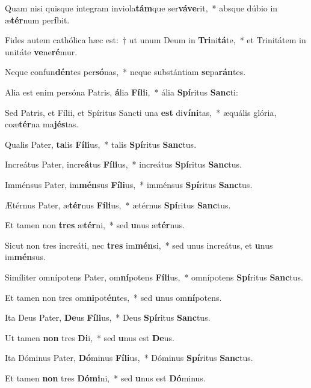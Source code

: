 \item Quam nisi quisque íntegram inviola\textbf{tám}que ser\textbf{vá}\textbf{ve}rit,~* absque dúbio in æ\textbf{tér}num per\textbf{í}bit.
\item Fides autem cathólica hæc est:~† ut unum Deum in \textbf{Tri}ni\textbf{tá}te,~* et Trinitátem in unitáte \textbf{ve}ne\textbf{ré}mur.
\item Neque confun\textbf{dén}tes per\textbf{só}nas,~* neque substántiam \textbf{se}pa\textbf{rán}tes.
\item Alia est enim persóna Patris, \textbf{á}lia \textbf{Fí}\textbf{li}i,~* ália \textbf{Spí}ritus \textbf{Sanc}ti:
\item Sed Patris, et Fílii, et Spíritus Sancti una \textbf{est} di\textbf{ví}\textbf{ni}tas,~* æquális glória, coæ\textbf{tér}na ma\textbf{jés}tas.
\item Qualis Pater, \textbf{ta}lis \textbf{Fí}\textbf{li}us,~* talis \textbf{Spí}ritus \textbf{Sanc}tus.
\item Increátus Pater, incre\textbf{á}tus \textbf{Fí}\textbf{li}us,~* increátus \textbf{Spí}ritus \textbf{Sanc}tus.
\item Imménsus Pater, im\textbf{mén}sus \textbf{Fí}\textbf{li}us,~* imménsus \textbf{Spí}ritus \textbf{Sanc}tus.
\item Ætérnus Pater, æ\textbf{tér}nus \textbf{Fí}\textbf{li}us,~* ætérnus \textbf{Spí}ritus \textbf{Sanc}tus.
\item Et tamen non \textbf{tres} æ\textbf{tér}ni,~* sed \textbf{u}nus æ\textbf{tér}nus.
\item Sicut non tres increáti, nec \textbf{tres} im\textbf{mén}si,~* sed unus increátus, et \textbf{u}nus im\textbf{mén}sus.
\item Simíliter omnípotens Pater, om\textbf{ní}potens \textbf{Fí}\textbf{li}us,~* omnípotens \textbf{Spí}ritus \textbf{Sanc}tus.
\item Et tamen non tres om\textbf{ni}pot\textbf{én}tes,~* sed \textbf{u}nus om\textbf{ní}potens.
\item Ita Deus Pater, \textbf{De}us \textbf{Fí}\textbf{li}us,~* Deus \textbf{Spí}ritus \textbf{Sanc}tus.
\item Ut tamen \textbf{non} tres \textbf{Di}i,~* sed \textbf{u}nus est \textbf{De}us.
\item Ita Dóminus Pater, \textbf{Dó}minus \textbf{Fí}\textbf{li}us,~* Dóminus \textbf{Spí}ritus \textbf{Sanc}tus.
\item Et tamen \textbf{non} tres \textbf{Dó}\textbf{mi}ni,~* sed \textbf{u}nus est \textbf{Dó}minus.
